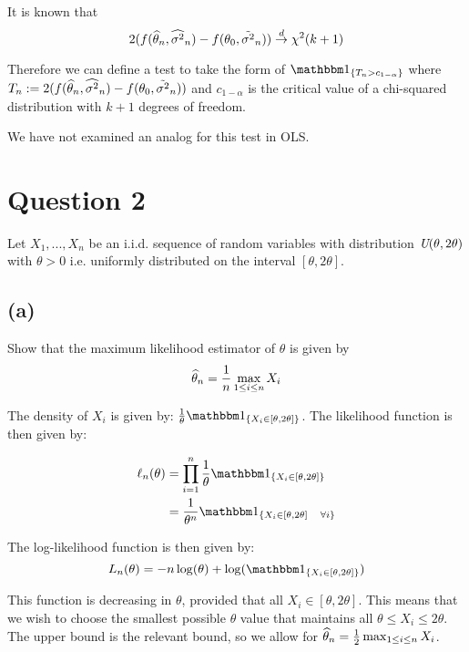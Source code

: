 \documentclass[12pt]{paper}
\begin{document}
\begin{itemize}
It is known that
\begin{equation*}
  2( f( \widehat{ \theta }_{n}, \widehat{ \sigma^2 }_{n}) - f( \theta_0, \tilde{ \sigma^2 }_{n})) \overset{d}{\to} \chi^2(k+1)
\end{equation*}

Therefore we can define a test to take the form of $\indicate{T_n >
  c_{1-\alpha}}$ where $T_n := 2( f( \widehat{ \theta }_{n}, \widehat{ \sigma^2 }_{n}) - f( \theta_0,
\tilde{ \sigma^2 }_{n}))$ and $c_{1-\alpha}$ is the critical value of a chi-squared
distribution with $k+1$ degrees of freedom.

We have not examined an analog for this test in OLS.
 
  
  
\end{itemize}

\section{Question 2}

Let $X_1,...,X_n$ be an i.i.d. sequence of random variables with
distribution $\emph{U}(\theta,2\theta)$ with $\theta > 0$ i.e. uniformly distributed on
the interval $[\theta,2\theta]$.

\subsection{(a)}

Show that the maximum likelihood estimator of $\theta$ is given by
\begin{equation*}
  \widehat{ \theta }_{n} = \frac{1}{n} \max_{1 \leq i \leq n} X_i
\end{equation*}

The density of $X_i$ is given by: $\frac{1}{\theta} \indicate{ X_i \in
  [\theta,2\theta]}$. The likelihood function is then given by:

\begin{align*}
  \ell_n(\theta) &= \prod_{i=1}^n \frac{1}{\theta} \indicate{ X_i \in [\theta,2\theta]}\\
  &= \frac{1}{\theta^n} \indicate{ X_i \in [\theta,2\theta] \quad \forall i}
\end{align*}

The log-likelihood function is then given by: 
\begin{equation*}
  L_n(\theta) = -n \log( \theta) + \log( \indicate{ X_i \in [\theta,2\theta] } )  
\end{equation*}

This function is decreasing in $\theta$, provided that all $X_i \in
[\theta,2\theta]$. This means that we wish to choose the smallest possible $\theta$
value that maintains all $\theta \leq X_i \leq 2\theta$. The upper bound is the
relevant bound, so we allow for $\widehat{ \theta }_{n} = \frac{1}{2} \max_{1\leq i \leq
  n}X_i$. 
\end{document}
